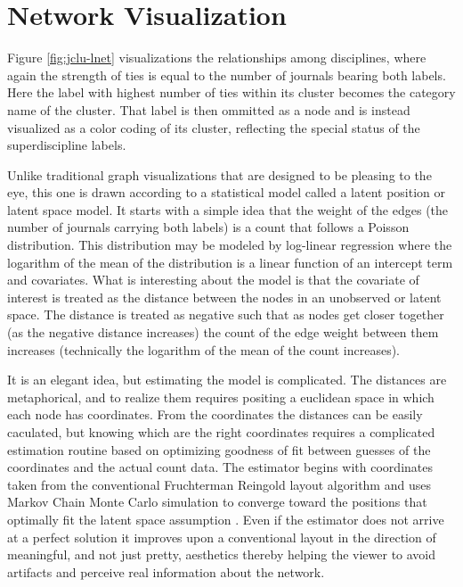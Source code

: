 \documentclass[]{book}
\begin{document}
\section{Network Visualization}\label{network-visualization}

Figure \ref{fig:jclu-lnet} visualizations the relationships among
disciplines, where again the strength of ties is equal to the number of
journals bearing both labels. Here the label with highest number of ties
within its cluster becomes the category name of the cluster. That label
is then ommitted as a node and is instead visualized as a color coding
of its cluster, reflecting the special status of the superdiscipline
labels.

Unlike traditional graph visualizations that are designed to be pleasing
to the eye, this one is drawn according to a statistical model called a
latent position or latent space model. It starts with a simple idea that
the weight of the edges (the number of journals carrying both labels) is
a count that follows a Poisson distribution. This distribution may be
modeled by log-linear regression where the logarithm of the mean of the
distribution is a linear function of an intercept term and covariates.
What is interesting about the model is that the covariate of interest is
treated as the distance between the nodes in an unobserved or latent
space. The distance is treated as negative such that as nodes get closer
together (as the negative distance increases) the count of the edge
weight between them increases (technically the logarithm of the mean of
the count increases).

It is an elegant idea, but estimating the model is complicated. The
distances are metaphorical, and to realize them requires positing a
euclidean space in which each node has coordinates. From the coordinates
the distances can be easily caculated, but knowing which are the right
coordinates requires a complicated estimation routine based on
optimizing goodness of fit between guesses of the coordinates and the
actual count data. The estimator begins with coordinates taken from the
conventional Fruchterman Reingold layout algorithm and uses Markov Chain
Monte Carlo simulation to converge toward the positions that optimally
fit the latent space assumption \citep[See][ for details of the model,
estimation, and software]{Krivitsky2008Fitting}. Even if the estimator
does not arrive at a perfect solution it improves upon a conventional
layout in the direction of meaningful, and not just pretty, aesthetics
thereby helping the viewer to avoid artifacts and perceive real
information about the network.
\end{document}
